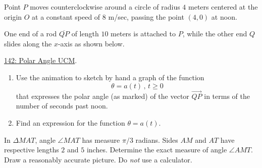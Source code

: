 \documentclass{ximera}
\begin{document}
\begin{question} \label{QOdejgERE34rd}

Point $P$ moves counterclockwise around a circle of radius $4$ meters centered at the origin $O$ at a constant speed of $8$ m/sec, passing the point $(4,0)$ at noon.


One end of a rod $\overline{QP}$ of length $10$ meters is attached to $P$, while the other end $Q$ slides along the $x$-axis as shown below. 
 
\href{https://www.desmos.com/calculator/dra9jtsynq}{142: Polar Angle UCM}.

 
\begin{onlineOnly}
    \begin{center}
\end{center}
\end{onlineOnly}


\begin{enumerate}

\item Use the animation to sketch by hand a graph of the function
\[
    \theta = a(t) \, , \, t\geq 0
\]
that expresses the polar angle (as marked) of the vector $\overrightarrow{QP}$ in terms of the number of seconds past noon.

\item Find an expression for the function $\theta = a(t)$.

\end{enumerate}
\end{question}


\begin{question} \label{Q898dfbfdgdsg}
In $\Delta MAT$, angle $\angle MAT$ has measure $\pi/3$ radians. Sides $AM$ and $AT$ have respective lengths $2$ and $5$ inches. Determine the exact measure of angle $\angle AMT$. Draw a reasonably accurate picture. Do \emph{not} use a calculator.
\end{question}
\end{document}
